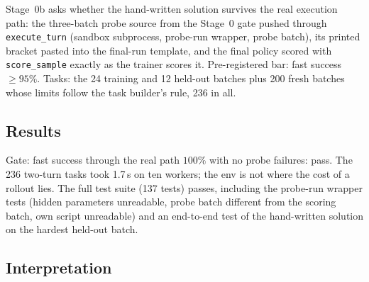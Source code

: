 \documentclass[11pt,a4paper]{article}
\begin{document}
Stage~0b asks whether the hand-written solution survives the real execution
path: the three-batch probe source from the Stage~0 gate pushed through
\texttt{execute\_turn} (sandbox subprocess, probe-run wrapper, probe batch),
its printed bracket pasted into the final-run template, and the final policy
scored with \texttt{score\_sample} exactly as the trainer scores it.
Pre-registered bar: fast success $\ge 95\%$. Tasks: the 24 training and 12
held-out batches plus 200 fresh batches whose limits follow the task
builder's rule, 236 in all.

\subsection*{Results}

\begin{center}\small
{}
\end{center}

Gate: fast success through the real path $100\%$ with no probe failures:
pass. The 236 two-turn tasks took 1.7\,s on ten workers; the env is not
where the cost of a rollout lies. The full test suite (137 tests) passes,
including the probe-run wrapper tests (hidden parameters unreadable, probe
batch different from the scoring batch, own script unreadable) and an
end-to-end test of the hand-written solution on the hardest held-out batch.

\subsection*{Interpretation}
\end{document}
